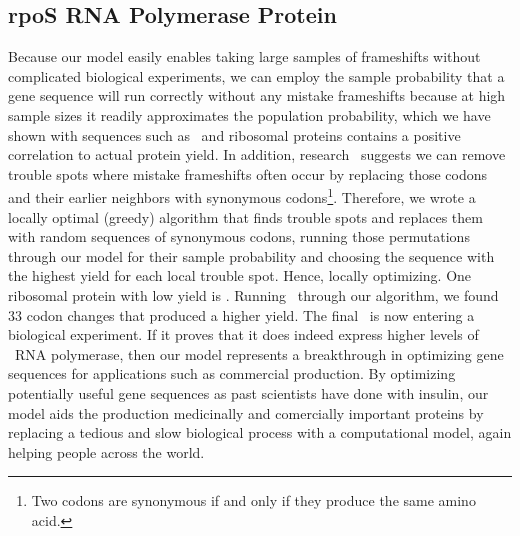 \documentclass[12pt, draft]{article}
\numberwithin{equation}{section}
\begin{document}
\subsection{rpoS RNA Polymerase Protein}
Because our model easily enables taking large samples of frameshifts without complicated biological experiments,
we can employ the sample probability that a gene sequence will run correctly without any mistake frameshifts because
at high sample sizes it readily approximates the population probability, which we have shown with sequences such as
\prfB\ and ribosomal proteins contains a positive correlation to actual protein yield. In addition, research~\cite{rare:yield}
suggests we can remove trouble spots where mistake frameshifts often occur by replacing those codons and their
earlier neighbors with synonymous codons\footnote{Two codons are synonymous if and only if they produce the same amino acid.}.
Therefore, we wrote a locally optimal (greedy) algorithm that finds trouble spots and replaces them with random sequences
of synonymous codons, running those permutations through our model for their sample probability and choosing the
sequence with the highest yield for each local trouble spot. Hence, locally optimizing. One ribosomal protein with
low yield is \rpoS. Running \rpoS\ through our algorithm, we found 33 codon changes that produced a higher yield.
The final \rpoS\ is now entering a biological experiment. If it proves that it does indeed express higher levels
of \rpoS\ RNA polymerase, then our model represents a breakthrough in optimizing gene sequences for applications
such as commercial production. By optimizing potentially useful gene sequences as past scientists have done with
insulin, our model aids the production medicinally and comercially important proteins by replacing a tedious and slow
biological process with a computational model, again helping people across the world.

\footnotesize
\begin{singlespace}
  
\end{singlespace}
\end{document}
